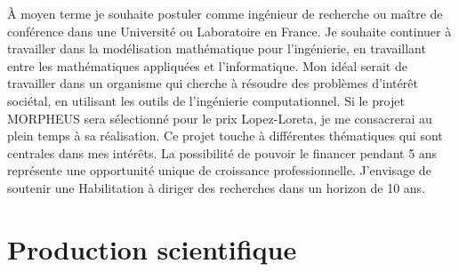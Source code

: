 \documentclass[12pt, french]{article}
\begin{document}
\`A moyen terme je souhaite postuler comme ingénieur de recherche ou maître de conférence dans une Université ou Laboratoire en France. Je souhaite continuer à travailler dans la modélisation mathématique pour l'ingénierie, en travaillant entre les mathématiques appliquées et l'informatique. Mon idéal serait de travailler dans un organisme qui cherche à résoudre des problèmes d'intérêt sociétal, en utilisant les outils de l'ingénierie computationnel.  Si le projet MORPHEUS sera sélectionné pour le prix Lopez-Loreta, je me consacrerai au plein temps à sa réalisation. Ce projet touche à différentes thématiques qui sont centrales dans mes intérêts. La possibilité de pouvoir le financer pendant 5 ans représente une opportunité unique de croissance professionnelle. J'envisage de soutenir une Habilitation à diriger des recherches dans un horizon de 10 ans.


\section{Production scientifique}
{

 
}





\end{document}

